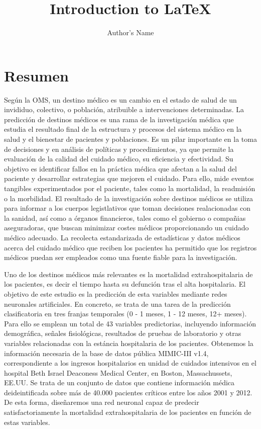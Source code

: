 \documentclass{report}
\begin{document}
\title{Introduction to \LaTeX{}}
\author{Author's Name}

\maketitle
\tableofcontents


\chapter*{Resumen}


\vspace{-5mm}
Según la OMS, un destino médico es un cambio en el estado de salud de un invididuo, colectivo, o población, atribuible a intervenciones determinadas. La predicción de destinos médicos es una rama de la investigación médica que estudia el resultado final de la estructura y procesos del sistema médico en la salud y el bienestar de pacientes y poblaciones. Es un pilar importante en la toma de decisiones y en análisis de políticas y procedimientos, ya que permite la evaluación de la calidad del cuidado médico, su eficiencia y efectividad. Su objetivo es identificar fallos en la práctica médica que afectan a la salud del paciente y desarrollar estrategias que mejoren el cuidado. Para ello, mide eventos tangibles experimentados por el paciente, tales como la mortalidad, la readmisión o la morbilidad. El resultado de la investigación sobre destinos médicos se utiliza para informar a los cuerpos legistlativos que toman decisiones realacionadas con la sanidad, así como a órganos financieros, tales como el gobierno o compañias aseguradoras, que buscan minimizar costes médicos proporcionando un cuidado médico adecuado. La recolecta estandarizada de estadísticas y datos médicos acerca del cuidado médico que reciben los pacientes ha permitido que los registros médicos puedan ser empleados como una fuente fiable para la investigación.


Uno de los destinos médicos más relevantes es la mortalidad extrahospitalaria de los pacientes, es decir el tiempo hasta su defunción tras el alta hospitalaria. El objetivo de este estudio es la predicción de esta variables mediante redes neuronales artificiales. En concreto, se trata de una tarea de la predicción clasificatoria en tres franjas temporales (0 - 1 meses, 1 - 12 meses, 12+ meses). Para ello se emplean un total de 43 variables predictorias, incluyendo información demográfica, señales fisiológicas, resultados de pruebas de laboratorio y otras variables relacionadas con la estáncia hospitalaria de los pacientes. Obtenemos la información necesaria de la base de datos pública MIMIC-III v1.4, correspondiente a los ingresos hospitalarios en unidad de cuidados intensivos en el hospital Beth Israel Deaconess Medical Center, en Boston, Massachussets, EE.UU. Se trata de un conjunto de datos que contiene información médica deideintificada sobre más de 40.000 pacientes críticos entre los años 2001 y 2012. De esta forma, diseñaremos una red neuronal capaz de predecir satisfactoriamente la mortalidad extrahospitalaria de los pacientes en función de estas variables.
\vspace{5mm} 
\end{document}
